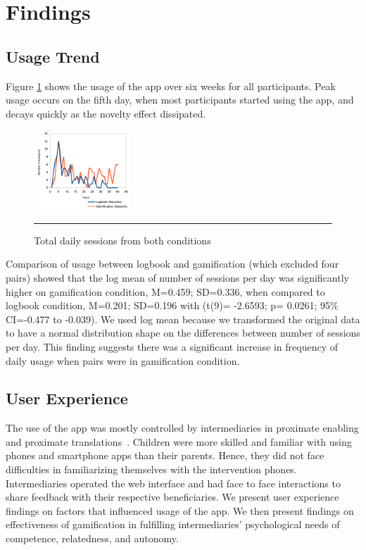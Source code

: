 \documentclass{sig-alternate}
\begin{document}
\section{Findings}
\subsection{Usage Trend} 
Figure \ref{figure:usagedailysessions} shows the usage of the app over six weeks for all participants. Peak usage occurs on the fifth day, when most participants started using the app, and decays quickly as the novelty effect dissipated. 
\begin{figure}[htbp]
  \centering
    \includegraphics[width=0.32\textwidth]{scatter_daily_sessions.png}
    \rule{26em}{0.5pt}
  \caption{Total daily sessions from both conditions}
  \label{figure:usagedailysessions}
\end{figure} 
Comparison of usage between logbook and gamification (which excluded four pairs) showed that the log mean of number of sessions per day was significantly higher on gamification condition, M=0.459; SD=0.336, when compared to logbook condition, M=0.201; SD=0.196 with (t(9)= -2.6593; p= 0.0261; 95\% CI=-0.477 to -0.039). We used log mean because we transformed the original data to have a normal distribution shape on the differences between number of sessions per day. This finding suggests there was a significant increase in frequency of daily usage when pairs were in gamification condition.

\subsection{User Experience}
The use of the app was mostly controlled by intermediaries in proximate enabling and proximate translations~\cite{sambasivan2010}. Children were more skilled and familiar with using phones and smartphone apps than their parents. Hence, they did not face difficulties in familiarizing themselves with the intervention phones. Intermediaries operated the web interface and had face to face interactions to share feedback with their respective beneficiaries. We present user experience findings on factors that influenced usage of the app. We then present findings on effectiveness of gamification in fulfilling intermediaries' psychological needs of competence, relatedness, and autonomy.
\end{document}
